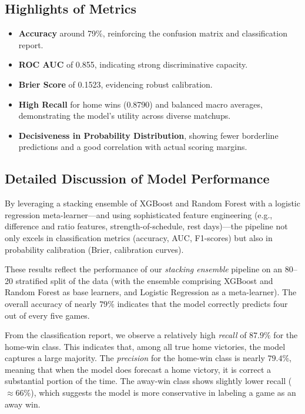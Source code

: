 \documentclass[12pt]{article}
\begin{document}
\subsection{Highlights of Metrics}
\begin{itemize}
  \item \textbf{Accuracy} around 79\%, reinforcing the confusion matrix and classification report.
  \item \textbf{ROC AUC} of 0.855, indicating strong discriminative capacity.
  \item \textbf{Brier Score} of 0.1523, evidencing robust calibration.
  \item \textbf{High Recall} for home wins (0.8790) and balanced macro averages, demonstrating the model’s utility across diverse matchups.
  \item \textbf{Decisiveness in Probability Distribution}, showing fewer borderline predictions and a good correlation with actual scoring margins.
\end{itemize}

\subsection{Detailed Discussion of Model Performance}
By leveraging a stacking ensemble of XGBoost and Random Forest with a logistic regression meta-learner—and using sophisticated feature engineering (e.g., difference and ratio features, strength-of-schedule, rest days)—the pipeline not only excels in classification metrics (accuracy, AUC, F1-scores) but also in probability calibration (Brier, calibration curves). 

These results reflect the performance of our \emph{stacking ensemble} pipeline on an 80--20 stratified split of the data (with the ensemble comprising XGBoost and Random Forest as base learners, and Logistic Regression as a meta-learner). The overall accuracy of nearly \(79\%\) indicates that the model correctly predicts four out of every five games. 

From the classification report, we observe a relatively high \emph{recall} of \(87.9\%\) for the home-win class. This indicates that, among all true home victories, the model captures a large majority. The \emph{precision} for the home-win class is nearly \(79.4\%\), meaning that when the model does forecast a home victory, it is correct a substantial portion of the time. The away-win class shows slightly lower recall (\(\approx66\%\)), which suggests the model is more conservative in labeling a game as an away win.
\end{document}
